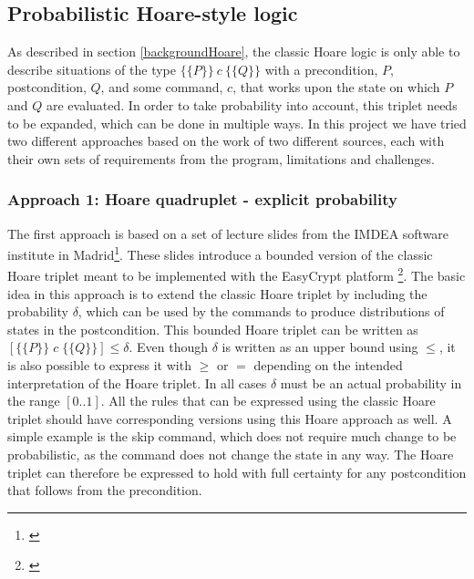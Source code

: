 \subsection{Probabilistic Hoare-style logic} \label{meatHoare}
As described in section \ref{backgroundHoare}, the classic Hoare logic is only able to describe situations of the type $\{\{P\}\}\ c\ \{\{Q\}\}$ with a precondition, $P$, postcondition, $Q$, and some command, $c$, that works upon the state on which $P$ and $Q$ are evaluated. In order to take probability into account, this triplet needs to be expanded, which can be done in multiple ways. In this project we have tried two different approaches based on the work of two different sources, each with their own sets of requirements from the program, limitations and challenges. 

\subsubsection{Approach 1: Hoare quadruplet - explicit probability} \label{meatApp1}
 \label{meatApp1Theory}
The first approach is based on a set of lecture slides from the IMDEA software institute in Madrid\footnote{\textcite{HoareSlides}}. These slides introduce a bounded version of the classic Hoare triplet meant to be implemented with the EasyCrypt platform \footnote{\textcite{easycrypt}}.
The basic idea in this approach is to extend the classic Hoare triplet by including the probability $\delta$, which can be used by the commands to produce distributions of states in the postcondition. This bounded Hoare triplet can be written as $[\{\{P\}\}\; c \;\{\{Q\}\}] \leq \delta$.
Even though $\delta$ is written as an upper bound using $\leq$, it is also possible to express it with $\geq$ or $=$ depending on the intended interpretation of the Hoare triplet.
In all cases $\delta$ must be an actual probability in the range $[0..1]$. All the rules that can be expressed using the classic Hoare triplet should have corresponding versions using this Hoare approach as well. A simple example is the skip command, which does not require much change to be probabilistic, as the command does not change the state in any way. The Hoare triplet can therefore be expressed to hold with full certainty for any postcondition that follows from the precondition.

 \begin{center}
 \begin{prooftree}
 \end{prooftree}
 \end{center}


